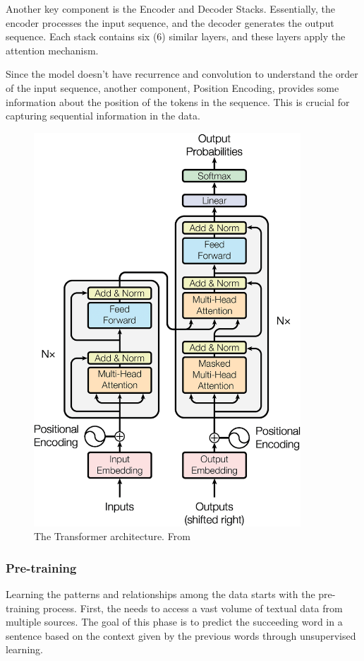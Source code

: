 Another key component is the Encoder and Decoder Stacks. Essentially, the encoder processes the input sequence, and the decoder generates the output sequence. Each stack contains six (6) similar layers, and these layers apply the attention mechanism.

Since the model doesn't have recurrence and convolution to understand the order of the input sequence, another component, Position Encoding, provides some information about the position of the tokens in the sequence. This is crucial for capturing sequential information in the data.

\begin{figure}[ht]
    \includegraphics[width=10cm]{figs/chapter2/transformer.png}
    \centering
    \caption{The Transformer architecture. From \citet{vaswani_attention_2023}}
\end{figure}


\subsubsection{Pre-training}

\citet{hadi_LLM_2023}

Learning the patterns and relationships among the data starts with the pre-training process. First, the {\llm} needs to access a vast volume of textual data from multiple sources. The goal of this phase is to predict the succeeding word in a sentence based on the context given by the previous words through unsupervised learning. 

